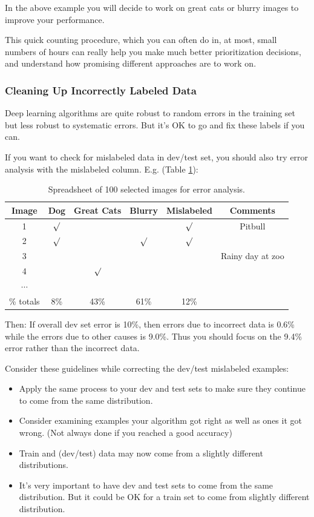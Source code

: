 In the above example you will decide to work on great cats or blurry images to improve your performance.

This quick counting procedure, which you can often do in, at most, small numbers of hours can really help you make much better prioritization decisions, and understand how promising different approaches are to work on.

\subsubsection{Cleaning Up Incorrectly Labeled Data}
Deep learning algorithms are quite robust to random errors in the training set but less robust to systematic errors. But it's OK to go and fix these labels if you can.

If you want to check for mislabeled data in dev/test set, you should also try error analysis with the mislabeled column. E.g. (Table \ref{mislabeled}):

\begin{table}[!htbp]
    \centering
    \begin{tabular}{c|c|c|c|c|c}
        \hline
        Image & Dog & Great Cats & Blurry & Mislabeled & Comments \\
        \hline
        1 & $\surd$ & & & $\surd$ & Pitbull\\
        2 & $\surd$ & & $\surd$ & $\surd$ &\\
        3 &&&&& Rainy day at zoo\\
        4 && $\surd$&&&\\
        $\cdots$ &&&&&\\
        \hline
        \% totals & 8\% & 43\% & 61\% & 12\% & \\
        \hline
    \end{tabular}
    \caption{Spreadsheet of 100 selected images for error analysis.}
    \label{mislabeled}
\end{table}

Then: If overall dev set error is 10\%, then errors due to incorrect data is 0.6\% while the errors due to other causes is 9.0\%. Thus you should focus on the 9.4\% error rather than the incorrect data.

Consider these guidelines while correcting the dev/test mislabeled examples:

\begin{itemize}
    \item Apply the same process to your dev and test sets to make sure they continue to come from the same distribution.
    \item Consider examining examples your algorithm got right as well as ones it got wrong. (Not always done if you reached a good accuracy)
    \item Train and (dev/test) data may now come from a slightly different distributions.
    \item It's very important to have dev and test sets to come from the same distribution. But it could be OK for a train set to come from slightly different distribution.
\end{itemize}

